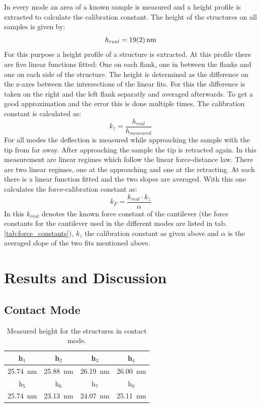 \documentclass[%
 reprint,
amsmath,amssymb,
pra,
]{revtex4-1}
\begin{document}
In every mode an area of a known sample is measured and a height profile is extracted to calculate the calibration constant. The height of the structures on all samples is given by:
\begin{equation*}
h_{real} = \SI{19 \pm 2}{nm}
\end{equation*}
For this purpose a height profile of a structure is extracted. At this profile there are five linear functions fitted: One on each flank, one in between the flanks and one on each side of the structure. The height is determined as the difference on the z-axes between the intersections of the linear fits. For this the difference is taken on the right and the left flank separatly and averaged afterwards. To get a good approximation and the error this is done multiple times. The calibration constant is calculated as:
\begin{equation*}
k_z = \dfrac{h_{real}}{h_{measured}}
\end{equation*}
For all modes the deflection is measured while approaching the sample with the tip from far away. After approaching the sample the tip is retracted again. In this measurement are linear regimes which follow the linear force-distance law. There are two linear regimes, one at the approaching and one at the retracting. At each there is a linear function fitted and the two slopes are averaged. With this one calculates the force-calibration constant as:
\begin{equation*}
k_F = \dfrac{k_{real} \cdot k_z}{\alpha}
\end{equation*}
In this $k_{real}$ denotes the known force constant of the cantilever (the force constants for the cantilever used in the different modes are listed in tab. \ref{tab:force_constants}), $k_z$ the calibration constant as given above and $\alpha$ is the averaged slope of the two fits mentioned above. \\


\section{Results and Discussion}
\subsection{Contact Mode}
\begin{table}[h]
\centering
\begin{tabular}{|c|c|c|c|}
\hline 
h$_1$ & h$_2$ & h$_3$ & h$_4$ \\ 
\hline 
\SI{25.74}{nm} & \SI{25.88}{nm} & \SI{26.19}{nm} & \SI{26.00}{nm}  \\ 
\hline 
h$_5$ & h$_6$ & h$_7$ & h$_8$ \\ 
\hline 
\SI{25.74}{nm} & \SI{23.13}{nm} & \SI{24.07}{nm} & \SI{25.11}{nm} \\ 
\hline 
\end{tabular} 
\caption{Measured height for the structures in contact mode.}
\label{tab:Contact_height}
\end{table}
\end{document}

